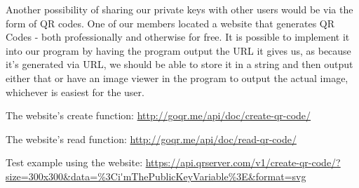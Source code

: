 Another possibility of sharing our private keys with other users would be via the
form of QR codes. One of our members located a website that generates QR Codes - 
both professionally and otherwise for free. It is possible to implement it into 
our program by having the program output the URL it gives us, as because it's 
generated via URL, we should be able to store it in a string and then output 
either that or have an image viewer in the program to output the actual image, 
whichever is easiest for the user.

The website's create function: 
\url{http://goqr.me/api/doc/create-qr-code/}

The website's read function:
\url{http://goqr.me/api/doc/read-qr-code/}

Test example using the website:
\url{https://api.qrserver.com/v1/create-qr-code/?size=300x300\&data=\%3Ci'mThePublicKeyVariable\%3E\&format=svg}
